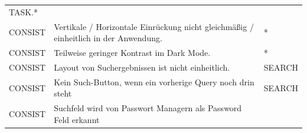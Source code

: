 \documentclass[
  12pt,
  ngerman,
  a4paper,
]{article}
\begin{document}
\begin{longtable}[]{@{}lll@{}}
\begin{minipage}[t]{0.23\columnwidth}
TASK.*\strut
\end{minipage}\tabularnewline
\begin{minipage}[t]{0.14\columnwidth}\raggedright
CONSIST\strut
\end{minipage} & \begin{minipage}[t]{0.55\columnwidth}\raggedright
Vertikale / Horizontale Einrückung nicht gleichmäßig / einheitlich in
der Anwendung.\strut
\end{minipage} & \begin{minipage}[t]{0.23\columnwidth}\raggedright
*\strut
\end{minipage}\tabularnewline
\begin{minipage}[t]{0.14\columnwidth}\raggedright
CONSIST\strut
\end{minipage} & \begin{minipage}[t]{0.55\columnwidth}\raggedright
Teilweise geringer Kontrast im Dark Mode.\strut
\end{minipage} & \begin{minipage}[t]{0.23\columnwidth}\raggedright
*\strut
\end{minipage}\tabularnewline
\begin{minipage}[t]{0.14\columnwidth}\raggedright
CONSIST\strut
\end{minipage} & \begin{minipage}[t]{0.55\columnwidth}\raggedright
Layout von Suchergebnissen ist nicht einheitlich.\strut
\end{minipage} & \begin{minipage}[t]{0.23\columnwidth}\raggedright
SEARCH\strut
\end{minipage}\tabularnewline
\begin{minipage}[t]{0.14\columnwidth}\raggedright
CONSIST\strut
\end{minipage} & \begin{minipage}[t]{0.55\columnwidth}\raggedright
Kein Such-Button, wenn ein vorherige Query noch drin steht\strut
\end{minipage} & \begin{minipage}[t]{0.23\columnwidth}\raggedright
SEARCH\strut
\end{minipage}\tabularnewline
\begin{minipage}[t]{0.14\columnwidth}\raggedright
CONSIST\strut
\end{minipage} & \begin{minipage}[t]{0.55\columnwidth}\raggedright
Suchfeld wird von Passwort Managern als Password Feld erkannt\strut
\end{minipage} & \begin{minipage}[t]{0.23\columnwidth}\raggedright

\end{minipage}
\end{longtable}
\end{document}
